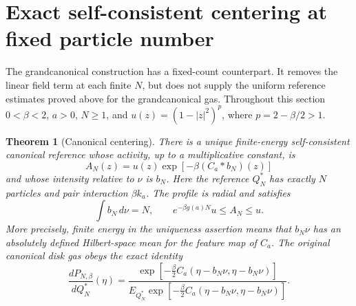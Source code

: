 \documentclass[11pt]{article}
\newtheorem{theorem}{Theorem}[section]
\theoremstyle{remark}\newtheorem{remark}[theorem]{Remark}
\begin{document}
\section{Exact self-consistent centering at fixed particle number}
\label{sec:canonical-self-centering}

The grandcanonical construction has a fixed-count counterpart. It removes
the linear field term at each finite $N$, but does not supply the uniform
reference estimates proved above for the grandcanonical gas.
Throughout this section $0<\beta<2$, $a>0$, $N\ge1$, and
$u(z)=(1-|z|^2)^p$, where $p=2-\beta/2>1$.

\begin{theorem}[Canonical centering]
\label{thm:canonical-self-centering}
There is a unique finite-energy self-consistent canonical reference
whose activity, up to a multiplicative constant, is
\[
 A_N(z)=u(z)\exp[-\beta(C_a*b_N)(z)]
\]
and whose intensity relative to $\nu$ is $b_N$.
Here the reference $Q_N^*$ has exactly $N$ particles and pair interaction
$\beta k_a$. The profile is radial and satisfies
\[
 \int b_N\,d\nu=N,\qquad
 e^{-\beta g(a)N}u\le A_N\le u.
\]
More precisely, finite energy in the uniqueness assertion means that
$b_N\nu$ has an absolutely defined Hilbert-space mean for the feature
map of $C_a$. The original canonical disk gas obeys the exact identity
\begin{equation}\label{eq:canonical-centered-exact}
 \frac{dP_{N,\beta}}{dQ_N^*}(\eta)
 =\frac{\exp[-\frac\beta2 C_a(\eta-b_N\nu,\eta-b_N\nu)]}
 {E_{Q_N^*}\exp[-\frac\beta2 C_a(\eta-b_N\nu,\eta-b_N\nu)]}.
\end{equation}
\end{theorem}
\end{document}
